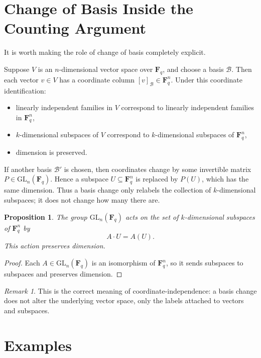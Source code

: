 \documentclass[11pt]{article}
\newtheorem{proposition}[theorem]{Proposition}
\theoremstyle{definition}
\theoremstyle{remark}
\newtheorem{remark}[theorem]{Remark}
\newcommand{\F}{\mathbf{F}}
\newcommand{\GL}{\mathrm{GL}}
\begin{document}
	\section{Change of Basis Inside the Counting Argument}
	
	It is worth making the role of change of basis completely explicit.
	
	Suppose \(V\) is an \(n\)-dimensional vector space over \(\F_q\), and choose a basis \(\mathcal B\). Then each vector \(v\in V\) has a coordinate column \([v]_{\mathcal B}\in \F_q^n\). Under this coordinate identification:
	
	\begin{itemize}
		\item linearly independent families in \(V\) correspond to linearly independent families in \(\F_q^n\),
		\item \(k\)-dimensional subspaces of \(V\) correspond to \(k\)-dimensional subspaces of \(\F_q^n\),
		\item dimension is preserved.
	\end{itemize}
	
	If another basis \(\mathcal B'\) is chosen, then coordinates change by some invertible matrix \(P\in \GL_n(\F_q)\). Hence a subspace \(U\subseteq \F_q^n\) is replaced by \(P(U)\), which has the same dimension. Thus a basis change only relabels the collection of \(k\)-dimensional subspaces; it does not change how many there are.
	
	\begin{proposition}
		The group \(\GL_n(\F_q)\) acts on the set of \(k\)-dimensional subspaces of \(\F_q^n\) by
		\[
		A\cdot U = A(U).
		\]
		This action preserves dimension.
	\end{proposition}
	
	\begin{proof}
		Each \(A\in \GL_n(\F_q)\) is an isomorphism of \(\F_q^n\), so it sends subspaces to subspaces and preserves dimension.
	\end{proof}
	
	\begin{remark}
		This is the correct meaning of coordinate-independence: a basis change does not alter the underlying vector space, only the labels attached to vectors and subspaces.
	\end{remark}
	
	\section{Examples}
	
\end{document}
